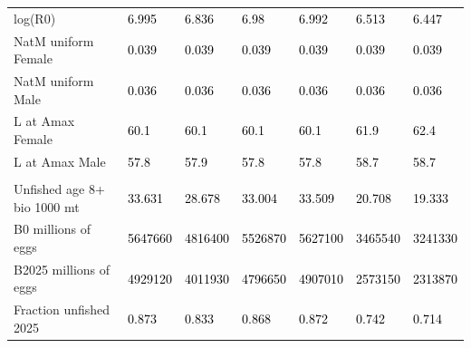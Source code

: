 \documentclass[
]{scrartcl}
\begin{document}
\begin{landscape}
\begin{longtable}[t]{ll>{\raggedright\arraybackslash}p{5em}>{\raggedright\arraybackslash}p{5em}>{\raggedright\arraybackslash}p{5em}>{\raggedright\arraybackslash}p{5em}>{\raggedright\arraybackslash}p{5em}}
\hspace{1em}log(R0) & \textcolor{black}{6.995} & \textcolor{black}{6.836} & \textcolor{black}{6.98} & \textcolor{black}{6.992} & \textcolor{black}{6.513} & \textcolor{black}{6.447}\\
\hspace{1em}NatM uniform Female & \textcolor{black}{0.039} & \textcolor{black}{0.039} & \textcolor{black}{0.039} & \textcolor{black}{0.039} & \textcolor{black}{0.039} & \textcolor{black}{0.039}\\
\hspace{1em}NatM uniform Male & \textcolor{black}{0.036} & \textcolor{black}{0.036} & \textcolor{black}{0.036} & \textcolor{black}{0.036} & \textcolor{black}{0.036} & \textcolor{black}{0.036}\\
\hspace{1em}L at Amax Female & \textcolor{black}{60.1} & \textcolor{black}{60.1} & \textcolor{black}{60.1} & \textcolor{black}{60.1} & \textcolor{black}{61.9} & \textcolor{black}{62.4}\\
\hspace{1em}L at Amax Male & \textcolor{black}{57.8} & \textcolor{black}{57.9} & \textcolor{black}{57.8} & \textcolor{black}{57.8} & \textcolor{black}{58.7} & \textcolor{black}{58.7}\\
\addlinespace[0.3em]
\multicolumn{7}{l}{\textbf{Estimates of derived quantities}}\\
\hspace{1em}Unfished age 8+ bio 1000 mt & \textcolor{black}{33.631} & \textcolor{black}{28.678} & \textcolor{black}{33.004} & \textcolor{black}{33.509} & \textcolor{black}{20.708} & \textcolor{black}{19.333}\\
\hspace{1em}B0 millions of eggs & \textcolor{black}{5647660} & \textcolor{black}{4816400} & \textcolor{black}{5526870} & \textcolor{black}{5627100} & \textcolor{black}{3465540} & \textcolor{black}{3241330}\\
\hspace{1em}B2025 millions of eggs & \textcolor{black}{4929120} & \textcolor{black}{4011930} & \textcolor{black}{4796650} & \textcolor{black}{4907010} & \textcolor{black}{2573150} & \textcolor{black}{2313870}\\
\hspace{1em}Fraction unfished 2025 & \textcolor{black}{0.873} & \textcolor{black}{0.833} & \textcolor{black}{0.868} & \textcolor{black}{0.872} & \textcolor{black}{0.742} & \textcolor{black}{0.714}\\

\end{longtable}
\end{landscape}
\end{document}
